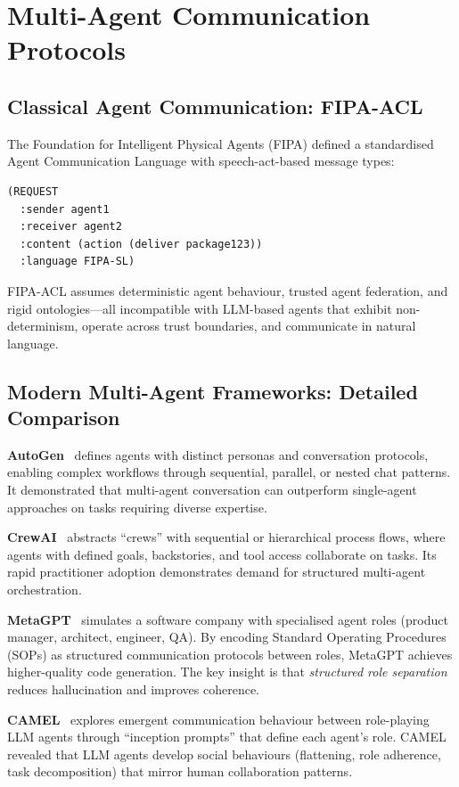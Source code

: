 \section{Multi-Agent Communication Protocols}

\subsection{Classical Agent Communication: FIPA-ACL}

The Foundation for Intelligent Physical Agents (FIPA) defined a standardised Agent Communication Language with speech-act-based message types:

\begin{verbatim}
(REQUEST
  :sender agent1
  :receiver agent2
  :content (action (deliver package123))
  :language FIPA-SL)
\end{verbatim}

FIPA-ACL assumes deterministic agent behaviour, trusted agent federation, and rigid ontologies---all incompatible with LLM-based agents that exhibit non-determinism, operate across trust boundaries, and communicate in natural language.

\subsection{Modern Multi-Agent Frameworks: Detailed Comparison}

\textbf{AutoGen}~\cite{wu2023autogen} defines agents with distinct personas and conversation protocols, enabling complex workflows through sequential, parallel, or nested chat patterns. It demonstrated that multi-agent conversation can outperform single-agent approaches on tasks requiring diverse expertise.

\textbf{CrewAI}~\cite{crewai2024} abstracts ``crews'' with sequential or hierarchical process flows, where agents with defined goals, backstories, and tool access collaborate on tasks. Its rapid practitioner adoption demonstrates demand for structured multi-agent orchestration.

\textbf{MetaGPT}~\cite{hong2023metagpt} simulates a software company with specialised agent roles (product manager, architect, engineer, QA). By encoding Standard Operating Procedures (SOPs) as structured communication protocols between roles, MetaGPT achieves higher-quality code generation. The key insight is that \textit{structured role separation} reduces hallucination and improves coherence.

\textbf{CAMEL}~\cite{li2023camel} explores emergent communication behaviour between role-playing LLM agents through ``inception prompts'' that define each agent's role. CAMEL revealed that LLM agents develop social behaviours (flattening, role adherence, task decomposition) that mirror human collaboration patterns.

